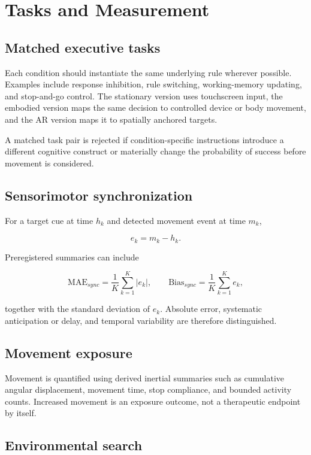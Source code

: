 \section{Tasks and Measurement}

\subsection{Matched executive tasks}

Each condition should instantiate the same underlying rule wherever possible. Examples include response inhibition, rule switching, working-memory updating, and stop-and-go control. The stationary version uses touchscreen input, the embodied version maps the same decision to controlled device or body movement, and the AR version maps it to spatially anchored targets.

A matched task pair is rejected if condition-specific instructions introduce a different cognitive construct or materially change the probability of success before movement is considered.

\subsection{Sensorimotor synchronization}

For a target cue at time \(h_k\) and detected movement event at time \(m_k\),

\[
e_k=m_k-h_k.
\]

Preregistered summaries can include

\[
\mathrm{MAE}_{sync}
=
\frac{1}{K}\sum_{k=1}^{K}|e_k|,
\qquad
\mathrm{Bias}_{sync}
=
\frac{1}{K}\sum_{k=1}^{K}e_k,
\]

together with the standard deviation of \(e_k\). Absolute error, systematic anticipation or delay, and temporal variability are therefore distinguished.

\subsection{Movement exposure}

Movement is quantified using derived inertial summaries such as cumulative angular displacement, movement time, stop compliance, and bounded activity counts. Increased movement is an exposure outcome, not a therapeutic endpoint by itself.

\subsection{Environmental search}

